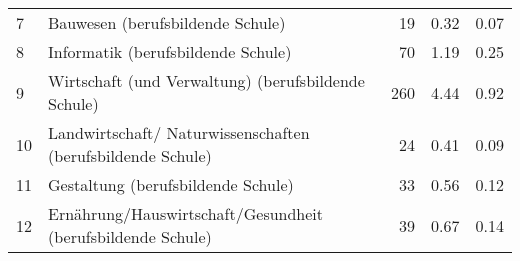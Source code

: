 \begin{longtable}{lXrrr}
     7 &
     \multicolumn{1}{X}{ Bauwesen (berufsbildende Schule)   } &


       \num{19} &
       \num[round-mode=places,round-precision=2]{0,32} &
         \num[round-mode=places,round-precision=2]{0,07} \\

     8 &
     \multicolumn{1}{X}{ Informatik (berufsbildende Schule)   } &


       \num{70} &
       \num[round-mode=places,round-precision=2]{1,19} &
         \num[round-mode=places,round-precision=2]{0,25} \\

     9 &
     \multicolumn{1}{X}{ Wirtschaft (und Verwaltung) (berufsbildende Schule)   } &


       \num{260} &
       \num[round-mode=places,round-precision=2]{4,44} &
         \num[round-mode=places,round-precision=2]{0,92} \\

     10 &
     \multicolumn{1}{X}{ Landwirtschaft/ Naturwissenschaften (berufsbildende Schule)   } &


       \num{24} &
       \num[round-mode=places,round-precision=2]{0,41} &
         \num[round-mode=places,round-precision=2]{0,09} \\

     11 &
     \multicolumn{1}{X}{ Gestaltung (berufsbildende Schule)   } &


       \num{33} &
       \num[round-mode=places,round-precision=2]{0,56} &
         \num[round-mode=places,round-precision=2]{0,12} \\

     12 &
     \multicolumn{1}{X}{ Ernährung/Hauswirtschaft/Gesundheit (berufsbildende Schule)   } &


       \num{39} &
       \num[round-mode=places,round-precision=2]{0,67} &
         \num[round-mode=places,round-precision=2]{0,14} \\


\end{longtable}
